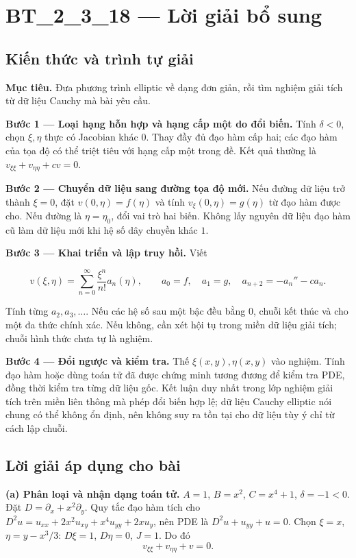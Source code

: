 \documentclass[10pt,a4paper]{article}
\begin{document}
\section*{BT\_2\_3\_18 — Lời giải bổ sung}
\subsection*{Kiến thức và trình tự giải}
\textbf{Mục tiêu.} Đưa phương trình elliptic về dạng đơn giản, rồi tìm nghiệm giải tích từ dữ liệu Cauchy mà bài yêu cầu.

\textbf{Bước 1 — Loại hạng hỗn hợp và hạng cấp một do đổi biến.} Tính $\delta<0$, chọn $\xi,\eta$ thực có Jacobian khác $0$. Thay đầy đủ đạo hàm cấp hai; các đạo hàm của tọa độ có thể triệt tiêu với hạng cấp một trong đề. Kết quả thường là $v_{\xi\xi}+v_{\eta\eta}+c v=0$.

\textbf{Bước 2 — Chuyển dữ liệu sang đường tọa độ mới.} Nếu đường dữ liệu trở thành $\xi=0$, đặt $v(0,\eta)=f(\eta)$ và tính $v_\xi(0,\eta)=g(\eta)$ từ đạo hàm được cho. Nếu đường là $\eta=\eta_0$, đổi vai trò hai biến. Không lấy nguyên dữ liệu đạo hàm cũ làm dữ liệu mới khi hệ số dây chuyền khác $1$.

\textbf{Bước 3 — Khai triển và lập truy hồi.} Viết


\[
v(\xi,\eta)=\sum_{n=0}^{\infty}\frac{\xi^n}{n!}a_n(\eta),\qquad
a_0=f,\quad a_1=g,\quad a_{n+2}=-a_n''-c a_n.
\]


Tính từng $a_2,a_3,\ldots$. Nếu các hệ số sau một bậc đều bằng $0$, chuỗi kết thúc và cho một đa thức chính xác. Nếu không, cần xét hội tụ trong miền dữ liệu giải tích; chuỗi hình thức chưa tự là nghiệm.

\textbf{Bước 4 — Đổi ngược và kiểm tra.} Thế $\xi(x,y),\eta(x,y)$ vào nghiệm. Tính đạo hàm hoặc dùng toán tử đã được chứng minh tương đương để kiểm tra PDE, đồng thời kiểm tra từng dữ liệu gốc. Kết luận duy nhất trong lớp nghiệm giải tích trên miền liên thông mà phép đổi biến hợp lệ; dữ liệu Cauchy elliptic nói chung có thể không ổn định, nên không suy ra tồn tại cho dữ liệu tùy ý chỉ từ cách lập chuỗi.
\subsection*{Lời giải áp dụng cho bài}
\textbf{(a) Phân loại và nhận dạng toán tử.} $A=1$, $B=x^2$, $C=x^4+1$, $\delta=-1<0$. Đặt $D=\partial_x+x^2\partial_y$. Quy tắc đạo hàm tích cho $D^2u=u_{xx}+2x^2u_{xy}+x^4u_{yy}+2xu_y$, nên PDE là $D^2u+u_{yy}+u=0$. Chọn $\xi=x$, $\eta=y-x^3/3$: $D\xi=1$, $D\eta=0$, $J=1$. Do đó
\[\boxed{v_{\xi\xi}+v_{\eta\eta}+v=0.}\]
\end{document}

